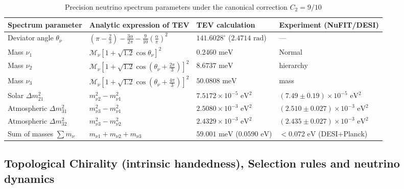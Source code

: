 \documentclass[11pt,a4paper]{article}
\theoremstyle{definition}
\theoremstyle{remark}
\begin{document}
\begin{table}[htbp]
\centering
\small
\setlength{\tabcolsep}{3.5pt}
\renewcommand{\arraystretch}{1.25}
\caption{Precision neutrino spectrum parameters under the canonical correction $C_2 = 9/10$}
\label{tab:neutrino_canonical_precision}
\vspace{2mm}
\begin{tabularx}{\textwidth}{
>{\raggedright\arraybackslash}p{2.8cm}
>{\centering\arraybackslash}X
>{\centering\arraybackslash}p{2.6cm}
>{\centering\arraybackslash}p{3.4cm}
}
\toprule
Spectrum parameter & Analytic expression of TEV & TEV calculation & Experiment (NuFIT/DESI) \\
\midrule
Deviator angle $\theta_\nu$ & $(\pi - \frac{2}{3}) - \frac{3\alpha}{2\pi} - \frac{9}{10}(\frac{\alpha}{\pi})^2$ & $141.6028^\circ$ ($2.4714\text{ rad}$) & — \\
Mass $\nu_1$ & $\mathcal{M}_\nu [1 + \sqrt{1.2}\cos\theta_\nu]^2$ & $0.2460\text{ meV}$ & Normal \\
Mass $\nu_2$ & $\mathcal{M}_\nu [1 + \sqrt{1.2}\cos(\theta_\nu + \frac{2\pi}{3})]^2$ & $8.6737\text{ meV}$ & hierarchy \\
Mass $\nu_3$ & $\mathcal{M}_\nu [1 + \sqrt{1.2}\cos(\theta_\nu + \frac{4\pi}{3})]^2$ & $50.0808\text{ meV}$ & mass \\
\midrule
Solar $\Delta m_{21}^2$ & $m_{\nu 2}^2 - m_{\nu 1}^2$ & $7.5172 \times 10^{-5}\text{ eV}^2$ & $(7.49 \pm 0.19) \times 10^{-5}\text{ eV}^2$ \\
Atmospheric $\Delta m_{31}^2$ & $m_{\nu 3}^2 - m_{\nu 1}^2$ & $2.5080 \times 10^{-3}\text{ eV}^2$ & $(2.510 \pm 0.027) \times 10^{-3}\text{ eV}^2$ \\
Atmospheric $\Delta m_{32}^2$ & $m_{\nu 3}^2 - m_{\nu 2}^2$ & $2.4329 \times 10^{-3}\text{ eV}^2$ & $(2.435 \pm 0.027) \times 10^{-3}\text{ eV}^2$ \\
\midrule
Sum of masses $\sum m_\nu$ & $m_{\nu 1} + m_{\nu 2} + m_{\nu 3}$ & $59.001\text{ meV}$ ($0.0590\text{ eV}$) & $< 0.072\text{ eV}$ (DESI+Planck) \\
\bottomrule
\end{tabularx}
\end{table}

\subsection{Topological Chirality (intrinsic handedness), Selection rules and neutrino dynamics}
\label{subsec:chirality_selection_rules}
\end{document}
